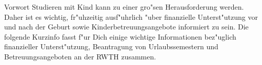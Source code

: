 \begin{artikel}{Vorwort}
Studieren mit Kind kann zu einer gro"sen Herausforderung werden. Daher ist es wichtig, fr"uhzeitig ausf"uhrlich "uber finanzielle Unterst"utzung vor und nach der Geburt sowie Kinderbetreuungsangebote informiert zu sein. Die folgende Kurzinfo fasst f"ur Dich einige wichtige Informationen bez"uglich finanzieller Unterst"utzung, Beantragung von Urlaubssemestern und Betreuungsangeboten an der RWTH zusammen.
\end{artikel}
